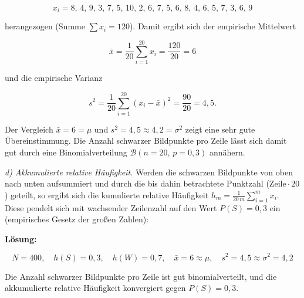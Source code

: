 \begin{beispiel}
$$
x_i = 8,\,4,\,9,\,3,\,7,\,5,\,10,\,2,\,6,\,7,\,5,\,6,\,8,\,4,\,6,\,5,\,7,\,3,\,6,\,9
$$

herangezogen (Summe $\sum x_i = 120$). Damit ergibt sich der empirische
Mittelwert

$$
\bar{x} = \frac{1}{20}\sum_{i=1}^{20} x_i = \frac{120}{20} = 6
$$

und die empirische Varianz

$$
s^2 = \frac{1}{20}\sum_{i=1}^{20} (x_i - \bar{x})^2 = \frac{90}{20} = 4{,}5 .
$$

Der Vergleich $\bar{x} = 6 = \mu$ und $s^2 = 4{,}5 \approx 4{,}2 = \sigma^2$ zeigt
eine sehr gute Übereinstimmung. Die Anzahl schwarzer Bildpunkte pro Zeile lässt
sich damit gut durch eine Binomialverteilung $\mathcal{B}(n = 20,\,p = 0{,}3)$
annähern.

\emph{d) Akkumulierte relative Häufigkeit.} Werden die schwarzen Bildpunkte von
oben nach unten aufsummiert und durch die bis dahin betrachtete Punktzahl
($\text{Zeile} \cdot 20$) geteilt, so ergibt sich die kumulierte relative
Häufigkeit $h_m = \tfrac{1}{20\,m}\sum_{i=1}^{m} x_i$. Diese pendelt sich mit
wachsender Zeilenzahl auf den Wert $P(S) = 0{,}3$ ein (empirisches Gesetz der
großen Zahlen):

\begin{center}
\end{center}

\textbf{Lösung:}

$$
\boxed{N = 400, \quad h(S) = 0{,}3, \quad h(W) = 0{,}7, \quad
\bar{x} = 6 \approx \mu, \quad s^2 = 4{,}5 \approx \sigma^2 = 4{,}2}
$$

Die Anzahl schwarzer Bildpunkte pro Zeile ist gut binomialverteilt, und die
akkumulierte relative Häufigkeit konvergiert gegen $P(S) = 0{,}3$.

\end{beispiel}
